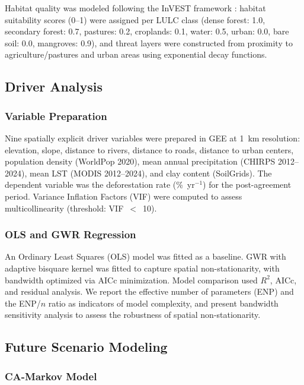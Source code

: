 \documentclass[12pt,a4paper]{article}
\begin{document}
Habitat quality was modeled following the InVEST framework \citep{Sharp2020}: habitat suitability scores (0--1) were assigned per LULC class (dense forest: 1.0, secondary forest: 0.7, pastures: 0.2, croplands: 0.1, water: 0.5, urban: 0.0, bare soil: 0.0, mangroves: 0.9), and threat layers were constructed from proximity to agriculture/pastures and urban areas using exponential decay functions.

\subsection{Driver Analysis}

\subsubsection{Variable Preparation}

Nine spatially explicit driver variables were prepared in GEE at 1~km resolution: elevation, slope, distance to rivers, distance to roads, distance to urban centers, population density (WorldPop 2020), mean annual precipitation (CHIRPS 2012--2024), mean LST (MODIS 2012--2024), and clay content (SoilGrids). The dependent variable was the deforestation rate (\%~yr$^{-1}$) for the post-agreement period. Variance Inflation Factors (VIF) were computed to assess multicollinearity (threshold: VIF~$<$~10).

\subsubsection{OLS and GWR Regression}

An Ordinary Least Squares (OLS) model was fitted as a baseline. GWR with adaptive bisquare kernel \citep{Fotheringham2002} was fitted to capture spatial non-stationarity, with bandwidth optimized via AICc minimization. Model comparison used $R^2$, AICc, and residual analysis. We report the effective number of parameters (ENP) and the ENP/$n$ ratio as indicators of model complexity, and present bandwidth sensitivity analysis to assess the robustness of spatial non-stationarity.

\subsection{Future Scenario Modeling}

\subsubsection{CA-Markov Model}
\end{document}

